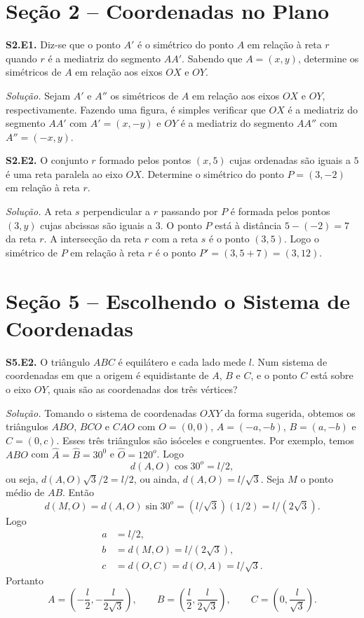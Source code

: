 \documentclass[a4paper,11pt]{article}
\begin{document}
\section*{Seção 2 -- Coordenadas no Plano}

\textbf{S2.E1.}
Diz-se que o ponto $A'$ é o simétrico do ponto $A$ em relação à reta $r$ quando $r$ é a mediatriz do segmento $AA'$.
Sabendo que $A = (x,y)$, determine os simétricos de $A$ em relação aos eixos $OX$ e $OY$.

\vspace{\baselineskip}

\emph{Solução.}
Sejam $A'$ e $A''$ os simétricos de $A$ em relação aos eixos $OX$ e $OY$, respectivamente.
Fazendo uma figura, é simples verificar que $OX$ é a mediatriz do segmento $AA'$ com $A' = (x,-y)$ e $OY$ é a mediatriz do segmento $AA''$ com $A''=(-x,y)$.

\vspace{\baselineskip}

\textbf{S2.E2.}
O conjunto $r$ formado pelos pontos $(x,5)$ cujas ordenadas são iguais a $5$ é uma reta paralela ao eixo $OX$.
Determine o simétrico do ponto $P = (3,-2)$ em relação à reta $r$.

\vspace{\baselineskip}

\emph{Solução.}
A reta $s$ perpendicular a $r$ passando por $P$ é formada pelos pontos $(3,y)$ cujas abcissas são iguais a $3$.
O ponto $P$ está à distância $5-(-2) = 7$ da reta $r$.
A intersecção da reta $r$ com a reta $s$ é o ponto $(3,5)$.
Logo o simétrico de $P$ em relação à reta $r$ é o ponto $P' = (3,5+7) = (3,12)$.

\section*{Seção 5 -- Escolhendo o Sistema de Coordenadas}

\textbf{S5.E2.}
O triângulo $ABC$ é equilátero e cada lado mede $l$.
Num sistema de coordenadas em que a origem é equidistante de $A$, $B$ e $C$, e o ponto $C$ está sobre o eixo $OY$, quais são as coordenadas dos três vértices?

\vspace{\baselineskip}

\emph{Solução.}
Tomando o sistema de coordenadas $OXY$ da forma sugerida, obtemos os triângulos $ABO$, $BCO$ e $CAO$ com $O = (0,0)$, $A = (-a,-b)$, $B = (a,-b)$ e $C = (0,c)$.
Esses três triângulos são isóceles e congruentes.
Por exemplo, temos $ABO$ com $\hat{A} = \hat{B} = 30^0$ e $\hat{O} = 120^o$.
Logo
\[
  d(A,O) \cos 30^o = l/2,
\]
ou seja, $d(A,O) \sqrt{3}/2 = l/2$, ou ainda, $d(A,O) = l/\sqrt{3}$.
Seja $M$ o ponto médio de $AB$.
Então
\[
  d(M,O) = d(A,O) \sin 30^o = (l/\sqrt{3})(1/2) = l/(2\sqrt{3}).
\]
Logo
\begin{align*}
  a & = l/2, \\
  b & = d(M,O) = l/(2\sqrt{3}), \\
  c & = d(O,C) = d(O,A) = l/\sqrt{3}.
\end{align*}
Portanto
\[
  A = \left(-\frac{l}{2}, -\frac{l}{2\sqrt{3}} \right), \qquad B = \left( \frac{l}{2}, \frac{l}{2\sqrt{3}} \right), \qquad C = \left(0, \frac{l}{\sqrt{3}} \right).
\]
\end{document}
